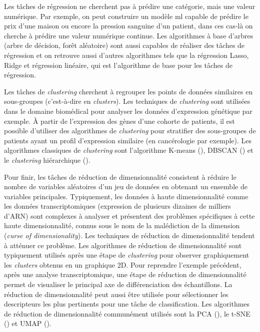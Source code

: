 Les tâches de régression ne cherchent pas à prédire une catégorie, mais une valeur numérique. Par exemple, on peut construire un modèle \gls{ml} capable de prédire le prix d'une maison ou encore la pression sanguine d'un patient, dans ces cas-là on cherche à prédire une valeur numérique continue. Les algorithmes à base d'arbres (arbre de décision, forêt aléatoire) sont aussi capables de réaliser des tâches de régression et on retrouve aussi d'autres algorithmes tels que la régression Lasso, Ridge et régression linéaire, qui est l'algorithme de base pour les tâches de régression.

Les tâches de \textit{clustering} cherchent à regrouper les points de données similaires en sous-groupes (c'est-à-dire en \textit{clusters}). Les techniques de \textit{clustering} sont utilisées dans le domaine biomédical pour analyser les données d'expression génétique par exemple. À partir de l'expression des gènes d'une cohorte de patients, il est possible d'utiliser des algorithmes de \textit{clustering} pour stratifier des sous-groupes de patients ayant un profil d'expression similaire (en cancérologie par exemple). Les algorithmes classiques de \textit{clustering} sont l'algorithme K-means (\cite{macqueen_methods_1967}), DBSCAN (\cite{ester_density-based_1996}) et le \textit{clustering} hiérarchique (\cite{cohen-addad_hierarchical_2017}).

Pour finir, les tâches de réduction de dimensionnalité consistent à réduire le nombre de variables aléatoires d'un jeu de données en obtenant un ensemble de variables principales. Typiquement, les données à haute dimensionnalité comme les données transcriptomiques (expression de plusieurs dizaines de milliers d'ARN) sont complexes à analyser et présentent des problèmes spécifiques à cette haute dimensionnalité, connus sous le nom de la malédiction de la dimension (\textit{curse of dimensionality}). Les techniques de réduction de dimensionnalité tendent à atténuer ce problème. Les algorithmes de réduction de dimensionnalité sont typiquement utilisés après une étape de \textit{clustering} pour observer graphiquement les \textit{clusters} obtenus en un graphique 2D. Pour reprendre l'exemple précédent, après une analyse transcriptomique, une étape de réduction de dimensionnalité permet de visualiser le principal axe de différenciation des échantillons. La réduction de dimensionnalité peut aussi être utilisée pour sélectionner les descripteurs les plus pertinents pour une tâche de classification. Les algorithmes de réduction de dimensionnalité communément utilisés sont la PCA (\cite{mackiewicz_principal_1993}), le t-SNE (\cite{maaten_visualizing_2008}) et UMAP (\cite{mcinnes_umap_2020}).

